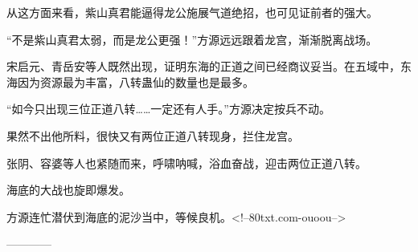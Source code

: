 \begin{this_body}
从这方面来看，紫山真君能逼得龙公施展气道绝招，也可见证前者的强大。

“不是紫山真君太弱，而是龙公更强！”方源远远跟着龙宫，渐渐脱离战场。

宋启元、青岳安等人既然出现，证明东海的正道之间已经商议妥当。在五域中，东海因为资源最为丰富，八转蛊仙的数量也是最多。

“如今只出现三位正道八转……一定还有人手。”方源决定按兵不动。

果然不出他所料，很快又有两位正道八转现身，拦住龙宫。

张阴、容婆等人也紧随而来，呼啸呐喊，浴血奋战，迎击两位正道八转。

海底的大战也旋即爆发。

方源连忙潜伏到海底的泥沙当中，等候良机。<!--80txt.com-ouoou-->

------------

\end{this_body}

